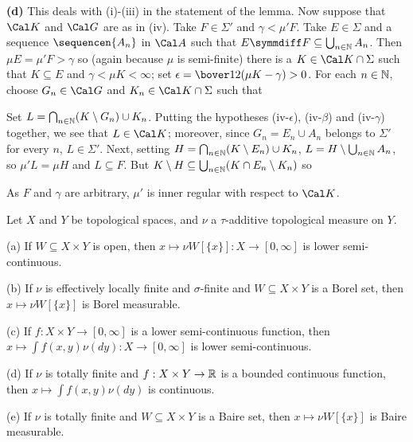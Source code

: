 {\medskip

{\bf (d)} This deals with (i)-(iii) in the statement of the lemma.   Now
suppose that $\Cal K$ and $\Cal G$ are as in (iv).   Take $F\in\Sigma'$ and
$\gamma<\mu'F$.   Take $E\in\Sigma$ and a sequence $\sequencen{A_n}$ in
$\Cal A$ such that $E\symmdiff F\subseteq\bigcup_{n\in\Bbb N}A_n$.
Then $\mu E=\mu'F>\gamma$ so (again because $\mu$ is semi-finite) there is
a $K\in\Cal K\cap\Sigma$ such that $K\subseteq E$ and
$\gamma<\mu K<\infty$;  set
$\epsilon=\bover12(\mu K-\gamma)>0$.   For each $n\in\Bbb N$, choose
$G_n\in\Cal G$ and $K_n\in\Cal K\cap\Sigma$ such that



\noindent Set $L=\bigcap_{n\in\Bbb N}(K\setminus G_n)\cup K_n$.
Putting the hypotheses (iv-$\epsilon$), (iv-$\beta$) and (iv-$\gamma$)
together, we see that $L\in\Cal K$;  moreover, since $G_n=E_n\cup A_n$
belongs to $\Sigma'$ for every $n$, $L\in\Sigma'$.   Next,
setting $H=\bigcap_{n\in\Bbb N}(K\setminus E_n)\cup K_n$,
$L=H\setminus\bigcup_{n\in\Bbb N}A_n$,
so $\mu'L=\mu H$ and $L\subseteq F$.   But
$K\setminus H\subseteq\bigcup_{n\in\Bbb N}(K\cap E_n\setminus K_n)$ so


\noindent As $F$ and $\gamma$ are arbitrary, $\mu'$ is inner regular with
respect to $\Cal K$.
}%

 Let $X$ and $Y$ be topological spaces, and $\nu$ a
$\tau$-additive topological measure on $Y$.

(a) If $W\subseteq X\times Y$ is open, then
$x\mapsto\nu W[\{x\}]:X\to[0,\infty]$ is lower semi-continuous.

(b) If $\nu$ is effectively locally finite and $\sigma$-finite and
$W\subseteq X\times Y$ is a Borel set, then $x\mapsto\nu W[\{x\}]$ is
Borel measurable.

(c) If $f:X\times Y\to[0,\infty]$ is a lower semi-continuous function,
then $x\mapsto\int f(x,y)\nu(dy):X\to[0,\infty]$ is lower
semi-continuous.

(d) If $\nu$ is totally finite and $f:X\times Y\to\Bbb R$ is a bounded
continuous function, then
$x\mapsto\int f(x,y)\nu(dy)$ is continuous.

(e) If $\nu$ is totally finite and $W\subseteq X\times Y$ is a Baire
set, then $x\mapsto\nu W[\{x\}]$ is Baire measurable.

